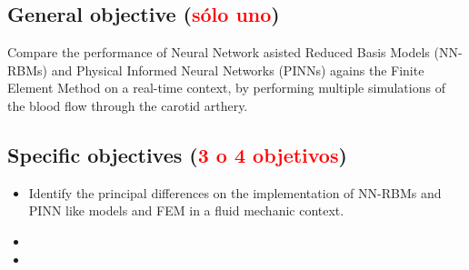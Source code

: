 \documentclass[12pt,letterpaper]{article}
\begin{document}
\subsection{General objective (\textcolor{red}{sólo uno})}

Compare the performance of Neural Network asisted Reduced Basis Models (NN-RBMs) and Physical Informed Neural Networks (PINNs)
agains the Finite Element Method on a real-time context, by performing multiple simulations 
of the blood flow through the carotid arthery.

\subsection{Specific objectives (\textcolor{red}{3 o 4 objetivos})}

\begin{itemize}
  \item Identify the principal differences on the implementation of NN-RBMs and PINN like models and FEM in a fluid mechanic context.
  \item 
  \item 
\end{itemize}
\end{document}
